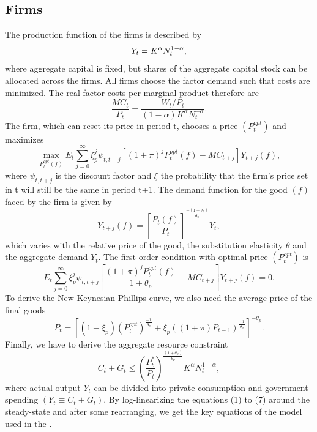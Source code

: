 \documentclass[12pt,a4paper,oneside,titlepage]{article}
\begin{document}
\subsection*{Firms}
The production function of the firms is described by
\begin{equation}
Y_t = K^\alpha N_t^{1-\alpha},\vspace{-0.3cm} \nonumber
\end{equation}
where aggregate capital is fixed, but shares of the aggregate capital stock can be allocated across the firms. All firms choose the factor demand such that costs are minimized. The real factor costs per marginal product therefore are
\begin{equation}
\frac{MC_t}{P_t} = \frac{W_t/P_t}{\left(1 - \alpha \right) K^\alpha N_t^{-\alpha}}.
\end{equation}
The firm, which can reset its price in period t, chooses a price $\left(P_t^{opt} \right)$ and maximizes
\begin{equation}
\max_{P_t^{opt}\left(f\right)} E_t \sum_{j=0}^\infty \xi_p^j \psi_{t,t+j} \left[ \left(1 + \pi \right)^j P_t^{opt}\left(f\right) - MC_{t+j} \right] Y_{t+j} \left(f\right),\nonumber
\end{equation}
where $\psi_{t,t+j}$ is the discount factor and $\xi$ the probability that the firm's price set in t will still be the same in period t+1. The demand function for the good $\left(f\right)$ faced by the firm is given by
\begin{equation}
Y_{t+j}\left(f\right) = \left[\frac{P_t \left(f\right)}{P_t} \right]^{\frac{-\left(1+\theta_p\right)}{\theta_p}} Y_t \nonumber,
\end{equation}
which varies with the relative price of the good, the substitution elasticity $\theta$ and the aggregate demand $Y_t$. The first order condition with optimal price $\left(P_t^{opt} \right)$ is
\begin{equation}
E_t \sum_{j=0}^\infty \xi_p^j \psi_{t,t+j} \left[ \frac{\left(1 + \pi \right)^j P_t^{opt}\left(f\right)}{1 + \theta_p} - MC_{t+j} \right] Y_{t+j}\left(f\right) = 0.
\end{equation}
To derive the New Keynesian Phillips curve, we also need the average price of the final goods
\begin{equation}
P_t = \left[\left(1 - \xi_p\right)\left(P_t^{opt}\right)^{\frac{-1}{\theta_p}} + \xi_p \left(\left(1 + \pi\right)P_{t-1}\right)^{\frac{-1}{\theta_p}} \right]^{-\theta_p}.
\end{equation}
Finally, we have to derive the aggregate resource constraint
\begin{equation}
C_t + G_t \leq \left(\frac{P_t^*}{P_t}\right)^{\frac{\left(1+\theta_p\right)}{\theta_p}} K^\alpha N_t^{1-\alpha},
\end{equation}
where actual output $Y_t$ can be divided into private consumption and government spending $\left(Y_t \equiv C_t + G_t \right)$.\newline
By log-linearizing the equations (1) to (7) around the steady-state and after some rearranging, we get the key equations of the model used in the \citet{Erceg.2014}.
\end{document}
